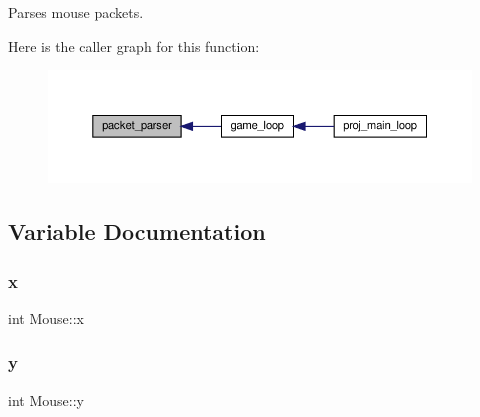 Parses mouse packets. 

Here is the caller graph for this function\+:
\nopagebreak
\begin{figure}[H]
\begin{center}
\leavevmode
\includegraphics[width=350pt]{group__mouse_ga7a4689a8f91c2155ea5a1117721b86b9_icgraph}
\end{center}
\end{figure}


\subsection{Variable Documentation}
\mbox{\label{group__mouse_ga136eea114b70f46392b89cc3779d4291}} 
\subsubsection{\texorpdfstring{x}{x}}
{\footnotesize\ttfamily int Mouse\+::x}

\mbox{\label{group__mouse_ga4a29b1c18faaa2fbe39ff985ba9d6737}} 
\subsubsection{\texorpdfstring{y}{y}}
{\footnotesize\ttfamily int Mouse\+::y}

